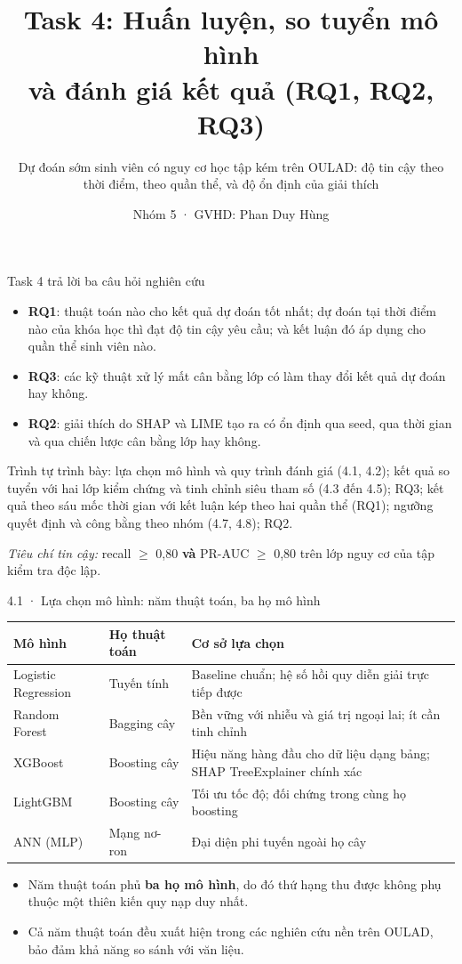 \documentclass[aspectratio=169,11pt]{beamer}
\title{Task 4: Huấn luyện, so tuyển mô hình\\và đánh giá kết quả (RQ1, RQ2, RQ3)}
\subtitle{Dự đoán sớm sinh viên có nguy cơ học tập kém trên OULAD: độ tin cậy theo thời điểm, theo quần thể, và độ ổn định của giải thích}
\author{Nhóm 5 · GVHD: Phan Duy Hùng}
\institute{Đại học FPT · DSP391m}
\date{}
\begin{document}
\begin{frame}\titlepage\end{frame}

\begin{frame}{Task 4 trả lời ba câu hỏi nghiên cứu}
\begin{itemize}
  \item \textbf{RQ1}: thuật toán nào cho kết quả dự đoán tốt nhất; dự đoán tại thời điểm nào của khóa học thì đạt độ tin cậy yêu cầu; và kết luận đó áp dụng cho quần thể sinh viên nào.
  \item \textbf{RQ3}: các kỹ thuật xử lý mất cân bằng lớp có làm thay đổi kết quả dự đoán hay không.
  \item \textbf{RQ2}: giải thích do SHAP và LIME tạo ra có ổn định qua seed, qua thời gian và qua chiến lược cân bằng lớp hay không.
\end{itemize}
\vspace{2mm}
Trình tự trình bày: lựa chọn mô hình và quy trình đánh giá (4.1, 4.2); kết quả so tuyển với hai lớp kiểm chứng và tinh chỉnh siêu tham số (4.3 đến 4.5); RQ3; kết quả theo sáu mốc thời gian với kết luận kép theo hai quần thể (RQ1); ngưỡng quyết định và công bằng theo nhóm (4.7, 4.8); RQ2.
\vspace{2mm}

\emph{Tiêu chí tin cậy:} recall $\geq$ 0,80 \textbf{và} PR-AUC $\geq$ 0,80 trên lớp nguy cơ của tập kiểm tra độc lập.
\end{frame}

\begin{frame}{4.1 · Lựa chọn mô hình: năm thuật toán, ba họ mô hình}
\small
\begin{tabular}{@{}lll@{}}
\toprule
\textbf{Mô hình} & \textbf{Họ thuật toán} & \textbf{Cơ sở lựa chọn} \\
\midrule
Logistic Regression & Tuyến tính & Baseline chuẩn; hệ số hồi quy diễn giải trực tiếp được \\
Random Forest & Bagging cây & Bền vững với nhiễu và giá trị ngoại lai; ít cần tinh chỉnh \\
XGBoost & Boosting cây & Hiệu năng hàng đầu cho dữ liệu dạng bảng; SHAP TreeExplainer chính xác \\
LightGBM & Boosting cây & Tối ưu tốc độ; đối chứng trong cùng họ boosting \\
ANN (MLP) & Mạng nơ-ron & Đại diện phi tuyến ngoài họ cây \\
\bottomrule
\end{tabular}
\vspace{4mm}
\begin{itemize}
  \item Năm thuật toán phủ \textbf{ba họ mô hình}, do đó thứ hạng thu được không phụ thuộc một thiên kiến quy nạp duy nhất.
  \item Cả năm thuật toán đều xuất hiện trong các nghiên cứu nền trên OULAD, bảo đảm khả năng so sánh với văn liệu.
\end{itemize}
\end{frame}
\end{document}

